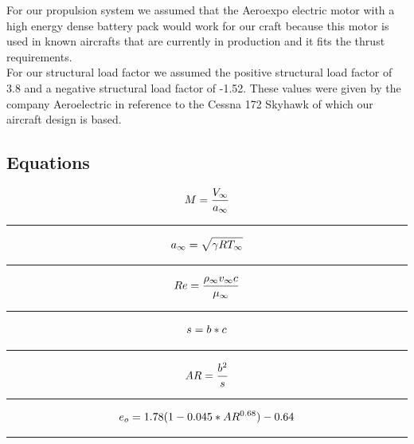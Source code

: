 \documentclass[12pt,A4paper]{article}
\begin{document}
	\indent For our propulsion system we assumed that the Aeroexpo electric motor with a high energy dense battery pack would work for our craft because this motor is used in known aircrafts that are currently in production and it fits the thrust requirements. \\
	\indent For our structural load factor we assumed the positive structural load factor of 3.8 and a negative structural load factor of -1.52. These values were given by the company Aeroelectric in reference to the Cessna 172 Skyhawk of which our aircraft design is based.\\

	\clearpage
	\begin{multicols*}{2}
			
	
	\section{Equations}
	\scriptsize
		\begin{equation} \label{eq1} 
			M = \frac{V_\infty }{a_\infty} \\ 
		\end{equation}
		\hrule
		\vspace{0.1 in}
		\begin{equation}
			a_\infty = \sqrt{\gamma R T_\infty} \\
		\end{equation}
		\hrule
		\vspace{0.1 in}
		\begin{equation}
			Re = \frac{\rho_\infty v_\infty c}{\mu_\infty} \\
		\end{equation}
		\hrule
		\vspace{0.1 in}
		\begin{equation}
			s = b * c \\
		\end{equation}
		\hrule
		\vspace{0.1 in}
		\begin{equation}
			AR = \frac{b^2}{s} \\
		\end{equation}
		\hrule
		\vspace{0.1 in}
		\begin{equation}
			e_o = 1.78(1 - 0.045*AR^{0.68}) - 0.64 \\
		\end{equation}
		\hrule
		\vspace{0.1 in}
		\begin{equation}

\end{equation}
\end{multicols*}
\end{document}

